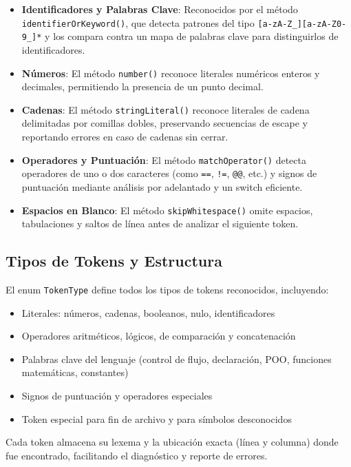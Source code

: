 \documentclass[11pt, a4paper, twoside]{article} %
\begin{document}
\begin{itemize}
    \item \textbf{Identificadores y Palabras Clave}: Reconocidos por el método \texttt{identifierOrKeyword()}, que detecta patrones del tipo \texttt{[a-zA-Z\_][a-zA-Z0-9\_]*} y los compara contra un mapa de palabras clave para distinguirlos de identificadores.
    \item \textbf{Números}: El método \texttt{number()} reconoce literales numéricos enteros y decimales, permitiendo la presencia de un punto decimal.
    \item \textbf{Cadenas}: El método \texttt{stringLiteral()} reconoce literales de cadena delimitadas por comillas dobles, preservando secuencias de escape y reportando errores en caso de cadenas sin cerrar.
    \item \textbf{Operadores y Puntuación}: El método \texttt{matchOperator()} detecta operadores de uno o dos caracteres (como \texttt{==}, \texttt{!=}, \texttt{@@}, etc.) y signos de puntuación mediante análisis por adelantado y un switch eficiente.
    \item \textbf{Espacios en Blanco}: El método \texttt{skipWhitespace()} omite espacios, tabulaciones y saltos de línea antes de analizar el siguiente token.
\end{itemize}

\subsection{Tipos de Tokens y Estructura}

El enum \texttt{TokenType} define todos los tipos de tokens reconocidos, incluyendo:
\begin{itemize}
    \item Literales: números, cadenas, booleanos, nulo, identificadores
    \item Operadores aritméticos, lógicos, de comparación y concatenación
    \item Palabras clave del lenguaje (control de flujo, declaración, POO, funciones matemáticas, constantes)
    \item Signos de puntuación y operadores especiales
    \item Token especial para fin de archivo y para símbolos desconocidos
\end{itemize}

Cada token almacena su lexema y la ubicación exacta (línea y columna) donde fue encontrado, facilitando el diagnóstico y reporte de errores.
\end{document}
